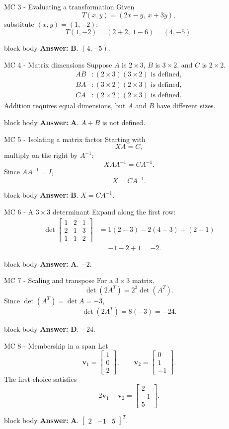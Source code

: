 \documentclass[aspectratio=169]{beamer}
\newcommand{\vect}[1]{\mathbf{#1}}
\newcommand{\answerbox}[1]{%
  \begin{beamercolorbox}[sep=1.0ex,wd=\linewidth]{block body}
    \textbf{Answer:} #1
  \end{beamercolorbox}}
\begin{document}
\begin{frame}{MC 3 - Evaluating a transformation}
Given
\[
T(x,y)=(2x-y,\ x+3y),
\]
substitute $(x,y)=(1,-2)$:
\[
T(1,-2)=(2+2,\ 1-6)=(4,-5).
\]
\answerbox{\textbf{B}. $(4,-5)$.}
\end{frame}

\begin{frame}{MC 4 - Matrix dimensions}
Suppose $A$ is $2\times3$, $B$ is $3\times2$, and $C$ is $2\times2$.
\begin{align*}
AB&:(2\times3)(3\times2)\text{ is defined},\\
BA&:(3\times2)(2\times3)\text{ is defined},\\
CA&:(2\times2)(2\times3)\text{ is defined}.
\end{align*}
Addition requires equal dimensions, but $A$ and $B$ have different sizes.
\answerbox{\textbf{A}. $A+B$ is not defined.}
\end{frame}

\begin{frame}{MC 5 - Isolating a matrix factor}
Starting with
\[
XA=C,
\]
multiply on the right by $A^{-1}$:
\[
XAA^{-1}=CA^{-1}.
\]
Since $AA^{-1}=I$,
\[
X=CA^{-1}.
\]
\answerbox{\textbf{B}. $X=CA^{-1}$.}
\end{frame}

\begin{frame}{MC 6 - A $3\times3$ determinant}
Expand along the first row:
\begin{align*}
\det\begin{bmatrix}1&2&1\\2&1&3\\1&1&2\end{bmatrix}
&=1(2-3)-2(4-3)+(2-1)\\
&=-1-2+1=-2.
\end{align*}
\answerbox{\textbf{A}. $-2$.}
\end{frame}

\begin{frame}{MC 7 - Scaling and transpose}
For a $3\times3$ matrix,
\[
\det(2A^T)=2^3\det(A^T).
\]
Since $\det(A^T)=\det A=-3$,
\[
\det(2A^T)=8(-3)=-24.
\]
\answerbox{\textbf{D}. $-24$.}
\end{frame}

\begin{frame}{MC 8 - Membership in a span}
Let
\[
\vect v_1=\begin{bmatrix}1\\0\\2\end{bmatrix},
\qquad
\vect v_2=\begin{bmatrix}0\\1\\-1\end{bmatrix}.
\]
The first choice satisfies
\[
2\vect v_1-\vect v_2
=\begin{bmatrix}2\\-1\\5\end{bmatrix}.
\]
\answerbox{\textbf{A}. $\begin{bmatrix}2&-1&5\end{bmatrix}^T$.}
\end{frame}
\end{document}
